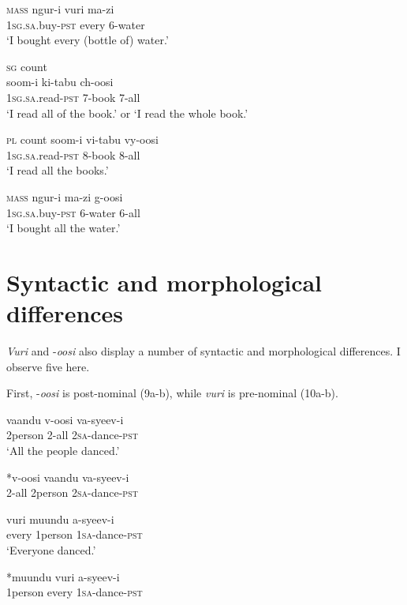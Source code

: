 \documentclass[output=paper]{langsci/langscibook}
\begin{document}
\ea
\textsc{mass}
\gll ngur-i      vuri    ma-zi    \\
     1\textsc{sg.sa}.buy-\textsc{pst}    every    6-water\\
\glt ‘I bought every (bottle of) water.’
\z

\ea
\textsc{sg} count\\
\gll soom-i      ki-tabu  ch-oosi    \\
     1\textsc{sg.sa}.read-\textsc{pst}  7-book  7-all\\
\glt ‘I read all of the book.’ or ‘I read the whole book.’
\z

\ea
\textsc{pl} count
\gll soom-i      vi-tabu  vy-oosi  \\
     1\textsc{sg.sa}.read-\textsc{pst}  8-book  8-all\\
\glt ‘I read all the books.’
\z

\ea
\textsc{mass}
\gll ngur-i      ma-zi    g-oosi  \\
     1\textsc{sg.sa}.buy-\textsc{pst}    6-water  6-all\\
\glt ‘I bought all the water.’
\z

\section{Syntactic and morphological differences}

\textit{Vuri} and -\textit{oosi} also display a number of syntactic and morphological differences. I observe five here.

  First, -\textit{oosi} is post-nominal (9a-b), while \textit{vuri} is pre-nominal (10a-b). 

\ea
\gll vaandu    v-oosi    va-syeev-i    \\
     2person    2-all    2\textsc{sa}{}-dance-\textsc{pst}       \\
\glt ‘All the people danced.’
\z

\ea
\gll \textup{*}v-oosi    vaandu  va-syeev-i  \\
     2-all    2person  2\textsc{sa}{}-dance-\textsc{pst}  \\
\z

\ea
\gll vuri    muundu  a-syeev-i    \\
     every    1person  1\textsc{sa}{}-dance-\textsc{pst}       \\
\glt ‘Everyone danced.’
\z

\ea
\gll \textup{*}muundu  vuri    a-syeev-i  \\
     1person    every    1\textsc{sa}{}-dance-\textsc{pst}    \\
\z
\end{document}
